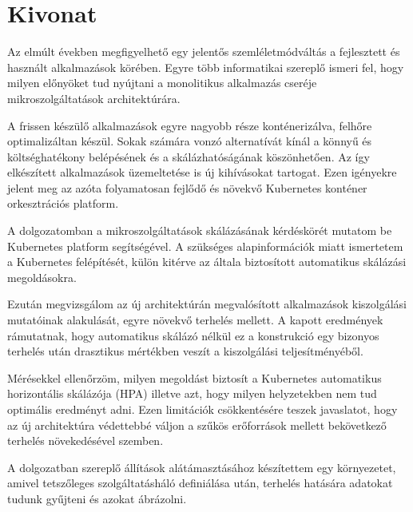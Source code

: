 \setcounter{page}{1}

\selecthungarian

\chapter*{Kivonat}

Az elmúlt években megfigyelhető egy jelentős szemléletmódváltás a fejlesztett és használt alkalmazások körében.
Egyre több informatikai szereplő ismeri fel, hogy milyen előnyöket tud nyújtani a monolitikus alkalmazás cseréje mikroszolgáltatások architektúrára.

A frissen készülő alkalmazások egyre nagyobb része konténerizálva, felhőre optimalizáltan készül.
Sokak számára vonzó alternatívát kínál a könnyű és költséghatékony belépésének és a skálázhatóságának köszönhetően.
Az így elkészített alkalmazások üzemeltetése  is új kihívásokat tartogat.
Ezen igényekre jelent meg az azóta folyamatosan fejlődő és növekvő Kubernetes konténer orkesztrációs platform.

A dolgozatomban a mikroszolgáltatások skálázásának kérdéskörét mutatom be Kubernetes platform segítségével.
A szükséges alapinformációk miatt ismertetem a Kubernetes felépítését, külön kitérve az általa biztosított automatikus skálázási megoldásokra.

Ezután megvizsgálom az új architektúrán megvalósított alkalmazások kiszolgálási mutatóinak alakulását, egyre növekvő terhelés mellett.
A kapott eredmények rámutatnak, hogy automatikus skálázó nélkül ez a konstrukció egy bizonyos terhelés után drasztikus mértékben veszít a kiszolgálási teljesítményéből.

Mérésekkel ellenőrzöm, milyen megoldást biztosít a Kubernetes automatikus horizontális skálázója (HPA) illetve azt, hogy milyen helyzetekben nem tud optimális eredményt adni.
Ezen limitációk csökkentésére teszek javaslatot, hogy az új architektúra védettebbé váljon a szűkös erőforrások mellett bekövetkező terhelés növekedésével szemben.

A dolgozatban szereplő állítások alátámasztásához készítettem egy környezetet, amivel tetszőleges szolgáltatásháló definiálása után, terhelés hatására adatokat tudunk gyűjteni és azokat ábrázolni.

 

